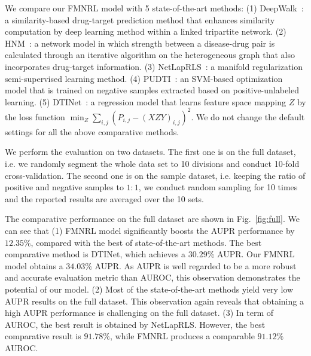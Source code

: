 \documentclass[sigconf,anonymous]{acmart}
\begin{document}
We compare our FMNRL model with 5 state-of-the-art methods: (1) DeepWalk~\cite{Zong2017Deep}: a similarity-based drug-target prediction method that enhances similarity computation by deep learning method within a linked tripartite network. (2) HNM~\cite{Wang2014Drug}: a network model in which strength between a disease-drug pair is calculated through an iterative algorithm on the heterogeneous graph that also incorporates drug-target information. (3) NetLapRLS~\cite{Xia2010Semi}: a manifold regularization semi-supervised learning method. (4) PUDTI~\cite{Peng2017Screening}: an SVM-based optimization model that is trained on negative samples extracted based on positive-unlabeled learning. (5) DTINet~\cite{Luo2017Network}: a regression model that learns feature space mapping $Z$ by the loss function  $\min_{Z} \sum_{i,j}(P_{i,j}-(XZY)_{i,j})^2$. We do not change the default settings for all the above comparative methods.


We perform the evaluation on two datasets. The first one is on the full dataset, i.e. we randomly segment the whole data set to 10 divisions and conduct 10-fold cross-validation. The second one is on the sample dataset, i.e. keeping the ratio of positive and negative samples to $1:1$, we conduct random sampling for 10 times and the reported results are averaged over the 10 sets. 

The comparative performance on the full dataset are shown in Fig.~\ref{fig:full}. We can see that (1) FMNRL model significantly boosts the AUPR performance by $12.35\%$, compared with the best of state-of-the-art methods. The best comparative method is DTINet, which achieves a $30.29\%$ AUPR. Our FMNRL model obtains a $34.03\%$ AUPR. As AUPR is well regarded to be a more robust and accurate evaluation metric than AUROC, this observation demonstrates the potential of our model. (2) Most of the state-of-the-art methods yield very low AUPR results on the full dataset. This observation again reveals that obtaining a high AUPR performance is challenging on the full dataset. (3) In term of AUROC, the best result is obtained by NetLapRLS. However, the best comparative result is $91.78\%$, while FMNRL produces a comparable $91.12\%$ AUROC. 
\end{document}
